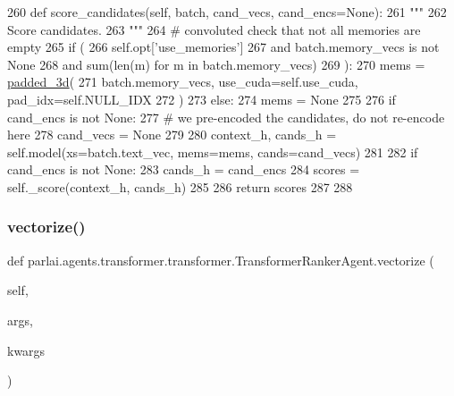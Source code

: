 \begin{DoxyCode}
260     \textcolor{keyword}{def }score\_candidates(self, batch, cand\_vecs, cand\_encs=None):
261         \textcolor{stringliteral}{"""}
262 \textcolor{stringliteral}{        Score candidates.}
263 \textcolor{stringliteral}{        """}
264         \textcolor{comment}{# convoluted check that not all memories are empty}
265         \textcolor{keywordflow}{if} (
266             self.opt[\textcolor{stringliteral}{'use\_memories'}]
267             \textcolor{keywordflow}{and} batch.memory\_vecs \textcolor{keywordflow}{is} \textcolor{keywordflow}{not} \textcolor{keywordtype}{None}
268             \textcolor{keywordflow}{and} sum(len(m) \textcolor{keywordflow}{for} m \textcolor{keywordflow}{in} batch.memory\_vecs)
269         ):
270             mems = \hyperlink{namespaceparlai_1_1utils_1_1misc_ad96b0c9ef6237d9ca051251089faf2c7}{padded\_3d}(
271                 batch.memory\_vecs, use\_cuda=self.use\_cuda, pad\_idx=self.NULL\_IDX
272             )
273         \textcolor{keywordflow}{else}:
274             mems = \textcolor{keywordtype}{None}
275 
276         \textcolor{keywordflow}{if} cand\_encs \textcolor{keywordflow}{is} \textcolor{keywordflow}{not} \textcolor{keywordtype}{None}:
277             \textcolor{comment}{# we pre-encoded the candidates, do not re-encode here}
278             cand\_vecs = \textcolor{keywordtype}{None}
279 
280         context\_h, cands\_h = self.model(xs=batch.text\_vec, mems=mems, cands=cand\_vecs)
281 
282         \textcolor{keywordflow}{if} cand\_encs \textcolor{keywordflow}{is} \textcolor{keywordflow}{not} \textcolor{keywordtype}{None}:
283             cands\_h = cand\_encs
284         scores = self.\_score(context\_h, cands\_h)
285 
286         \textcolor{keywordflow}{return} scores
287 
288 
\end{DoxyCode}
\mbox{\label{classparlai_1_1agents_1_1transformer_1_1transformer_1_1TransformerRankerAgent_a76ba1a57647f32877fce85a064952c5d}} 
\subsubsection{\texorpdfstring{vectorize()}{vectorize()}}
{\footnotesize\ttfamily def parlai.\+agents.\+transformer.\+transformer.\+Transformer\+Ranker\+Agent.\+vectorize (\begin{DoxyParamCaption}\item[{}]{self,  }\item[{}]{args,  }\item[{}]{kwargs }\end{DoxyParamCaption})}

